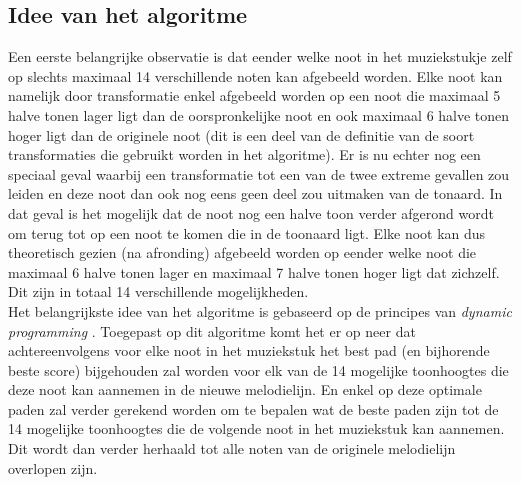\subsection{Idee van het algoritme}
Een eerste belangrijke observatie is dat eender welke noot in het muziekstukje zelf op slechts maximaal 14 verschillende noten kan afgebeeld worden. Elke noot kan namelijk door transformatie enkel afgebeeld worden op een noot die maximaal 5 halve tonen lager ligt dan de oorspronkelijke noot en ook maximaal 6 halve tonen hoger ligt dan de originele noot (dit is een deel van de definitie van de soort transformaties die gebruikt worden in het algoritme). Er is nu echter nog een speciaal geval waarbij een transformatie tot een van de twee extreme gevallen zou leiden en deze noot dan ook nog eens geen deel zou uitmaken van de tonaard. In dat geval is het mogelijk dat de noot nog een halve toon verder afgerond wordt om terug tot op een noot te komen die in de toonaard ligt. Elke noot kan dus theoretisch gezien (na afronding) afgebeeld worden op eender welke noot die maximaal 6 halve tonen lager en maximaal 7 halve tonen hoger ligt dat zichzelf. Dit zijn in totaal 14 verschillende mogelijkheden.\\
Het belangrijkste idee van het algoritme is gebaseerd op de principes van \textit{dynamic programming} \cite{url:DP}. Toegepast op dit algoritme komt het er op neer dat achtereenvolgens voor elke noot in het muziekstuk het best pad (en bijhorende beste score) bijgehouden zal worden voor elk van de 14 mogelijke toonhoogtes die deze noot kan aannemen in de nieuwe melodielijn. En enkel op deze optimale paden zal verder gerekend worden om te bepalen wat de beste paden zijn tot de 14 mogelijke toonhoogtes die de volgende noot in het muziekstuk kan aannemen. Dit wordt dan verder herhaald tot alle noten van de originele melodielijn overlopen zijn.

